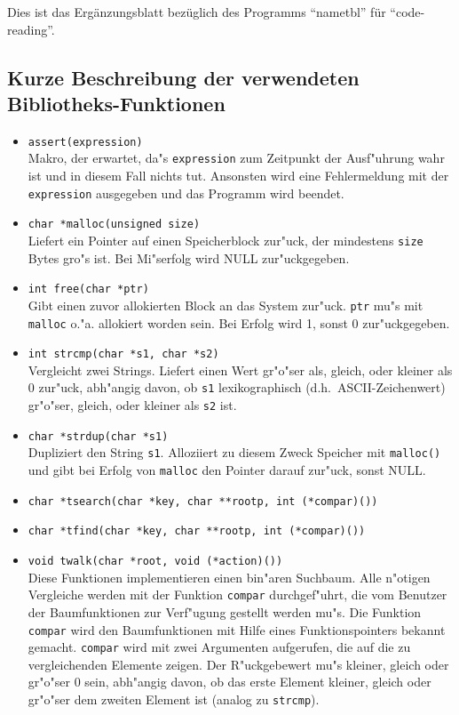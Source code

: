 

Dies ist das Erg\"anzungsblatt bez\"uglich des Programms "`nametbl"'
f\"ur "`code-reading"'.

\subsection*{Kurze Beschreibung der verwendeten Bibliotheks-Funktionen}

\begin{itemize}
	\item {\tt assert(expression)}\\
		Makro, der erwartet, da"s {\tt expression} zum Zeitpunkt der Ausf"uhrung
		wahr ist und in diesem Fall nichts tut. Ansonsten wird eine 
		Fehlermeldung mit der {\tt expression} ausgegeben und das Programm wird
		beendet.
	\item {\tt char *malloc(unsigned size)}\\
		Liefert ein Pointer auf einen Speicherblock zur"uck, der mindestens 
		{\tt size}
		Bytes gro"s ist. Bei Mi"serfolg wird NULL zur"uckgegeben.
	\item {\tt int free(char *ptr)}\\
		Gibt einen zuvor allokierten Block an das System zur"uck. {\tt ptr} 
		mu"s mit 
		{\tt malloc} o."a. allokiert worden sein. Bei Erfolg wird 1, sonst
 		0 zur"uckgegeben.
	\item {\tt int strcmp(char *s1, char *s2)}\\
		Vergleicht zwei Strings. Liefert einen Wert gr"o"ser als, gleich, oder
		kleiner als 0 zur"uck, abh"angig davon, ob {\tt s1} lexikographisch
		(d.h.~ASCII-Zeichenwert) gr"o"ser, gleich, oder 
		kleiner als {\tt s2} ist.	
	\item {\tt char *strdup(char *s1)}\\
		Dupliziert den String {\tt s1}. Alloziiert zu diesem Zweck Speicher
		mit {\tt malloc()} und gibt bei Erfolg von {\tt malloc} den 
		Pointer darauf zur"uck, sonst NULL.
	\item {\tt char *tsearch(char *key, char **rootp, int (*compar)())}
	\item {\tt char *tfind(char *key, char **rootp, int (*compar)())}
	\item {\tt void twalk(char *root, void (*action)())}\\
		Diese Funktionen implementieren einen bin"aren Suchbaum. Alle n"otigen
		Vergleiche werden mit der Funktion {\tt compar} durchgef"uhrt, die
		vom Benutzer der Baumfunktionen zur Verf"ugung gestellt werden mu"s. Die
		Funktion {\tt compar} wird den Baumfunktionen mit Hilfe eines
		Funktionspointers bekannt gemacht. {\tt compar} wird mit 
		zwei Argumenten
		aufgerufen, die auf die zu vergleichenden Elemente zeigen. Der 
		R"uckgebewert mu"s kleiner, gleich oder gr"o"ser 0 sein, abh"angig
		davon, ob das erste Element kleiner, gleich oder gr"o"ser dem zweiten
		Element ist (analog zu {\tt strcmp}).


\end{itemize}

